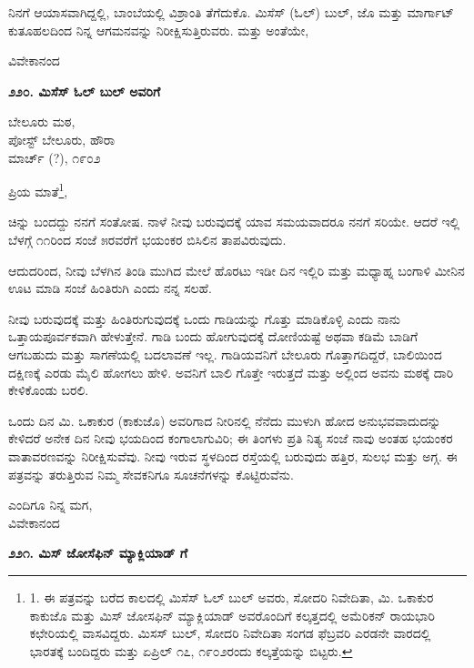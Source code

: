 ನಿನಗೆ ಆಯಾಸವಾಗಿದ್ದಲ್ಲಿ, ಬಾಂಬೆಯಲ್ಲಿ ವಿಶ್ರಾಂತಿ ತೆಗೆದುಕೊ. ಮಿಸೆಸ್ (ಓಲ್) ಬುಲ್, ಜೊ ಮತ್ತು ಮಾರ್ಗಾಟ್ ಕುತೂಹಲದಿಂದ ನಿನ್ನ ಆಗಮನವನ್ನು ನಿರೀಕ್ಷಿಸುತ್ತಿರುವರು. ಮತ್ತು ಅಂತೆಯೇ,

\begin{flushright}
ವಿವೇಕಾನಂದ
\end{flushright}

\begin{center}
\textbf{೨೨೦. ಮಿಸೆಸ್ ಓಲ್ ಬುಲ್ ಅವರಿಗೆ}
\end{center}

\begin{flushright}
ಬೇಲೂರು ಮಠ,\\ಪೋಸ್ಟ್ ಬೇಲೂರು, ಹೌರಾ\\ಮಾರ್ಚ್ (?), ೧೯೦೨
\end{flushright}

ಪ್ರಿಯ ಮಾತೆ\footnote{1. ಈ ಪತ್ರವನ್ನು ಬರೆದ ಕಾಲದಲ್ಲಿ ಮಿಸೆಸ್ ಓಲ್ ಬುಲ್ ಅವರು, ಸೋದರಿ ನಿವೇದಿತಾ, ಮಿ. ಒಕಾಕುರ ಕಾಕುಜೊ ಮತ್ತು ಮಿಸ್ ಜೋಸಫಿನ್ ಮ್ಯಾಕ್ಲಿಯಾಡ್ ಅವರೊಂದಿಗೆ ಕಲ್ಕತ್ತದಲ್ಲಿ ಅಮೆರಿಕನ್ ರಾಯಭಾರಿ ಕಛೇರಿಯಲ್ಲಿ ವಾಸವಿದ್ದರು. ಮಿಸಸ್ ಬುಲ್, ಸೋದರಿ ನಿವೇದಿತಾ ಸಂಗಡ ಫೆಬ್ರವರಿ ಎರಡನೇ ವಾರದಲ್ಲಿ ಭಾರತಕ್ಕೆ ಬಂದಿದ್ದರು ಮತ್ತು ಏಪ್ರಿಲ್ ೧೭, ೧೯೦೨ರಂದು ಕಲ್ಕತ್ತೆಯನ್ನು ಬಿಟ್ಟರು.},

ಚಿನ್ನು ಬಂದದ್ದು ನನಗೆ ಸಂತೋಷ. ನಾಳೆ ನೀವು ಬರುವುದಕ್ಕೆ ಯಾವ ಸಮಯವಾದರೂ ನನಗೆ ಸರಿಯೇ. ಆದರೆ ಇಲ್ಲಿ ಬೆಳಗ್ಗೆ ೧೧ರಿಂದ ಸಂಜೆ ೫ರವರೆಗೆ ಭಯಂಕರ ಬಿಸಿಲಿನ ತಾಪವಿರುವುದು.

ಆದುದರಿಂದ, ನೀವು ಬೆಳಗಿನ ತಿಂಡಿ ಮುಗಿದ ಮೇಲೆ ಹೊರಟು ಇಡೀ ದಿನ ಇಲ್ಲಿರಿ ಮತ್ತು ಮಧ್ಯಾಹ್ನ ಬಂಗಾಳಿ ಮೀನಿನ ಊಟ ಮಾಡಿ ಸಂಜೆ ಹಿಂತಿರುಗಿ ಎಂದು ನನ್ನ ಸಲಹೆ.

ನೀವು ಬರುವುದಕ್ಕೆ ಮತ್ತು ಹಿಂತಿರುಗುವುದಕ್ಕೆ ಒಂದು ಗಾಡಿಯನ್ನು ಗೊತ್ತು ಮಾಡಿಕೊಳ್ಳಿ ಎಂದು ನಾನು ಒತ್ತಾಯಪೂರ್ವಕವಾಗಿ ಹೇಳುತ್ತೇನೆ. ಗಾಡಿ ಬಂದು ಹೋಗುವುದಕ್ಕೆ ದೋಣಿಯಷ್ಟೆ ಅಥವಾ ಕಡಿಮೆ ಬಾಡಿಗೆ ಆಗಬಹುದು ಮತ್ತು ಸಾಗಣೆಯಲ್ಲಿ ಬದಲಾವಣೆ ಇಲ್ಲ. ಗಾಡಿಯವನಿಗೆ ಬೇಲೂರು ಗೊತ್ತಾಗದಿದ್ದರೆ, ಬಾಲಿಯಿಂದ ದಕ್ಷಿಣಕ್ಕೆ ಎರಡು ಮೈಲಿ ಹೋಗಲು ಹೇಳಿ. ಅವನಿಗೆ ಬಾಲಿ ಗೊತ್ತೇ ಇರುತ್ತದೆ ಮತ್ತು ಅಲ್ಲಿಂದ ಅವನು ಮಠಕ್ಕೆ ದಾರಿ ಕೇಳಿಕೊಂಡು ಬರಲಿ.

ಒಂದು ದಿನ ಮಿ. ಒಕಾಕುರ (ಕಾಕುಜೊ) ಅವರಿಗಾದ ನೀರಿನಲ್ಲಿ ನೆನೆದು ಮುಳುಗಿ ಹೋದ ಅನುಭವವಾದುದನ್ನು ಕೇಳಿದರೆ ಅನೇಕ ದಿನ ನೀವು ಭಯದಿಂದ ಕಂಗಾಲಾಗುವಿರಿ; ಈ ತಿಂಗಳು ಪ್ರತಿ ನಿತ್ಯ ಸಂಜೆ ನಾವು ಅಂತಹ ಭಯಂಕರ ವಾತಾವರಣವನ್ನು ನಿರೀಕ್ಷಿಸುವೆವು. ನೀವು ಇರುವ ಸ್ಥಳದಿಂದ ರಸ್ತೆಯಲ್ಲಿ ಬರುವುದು ಹತ್ತಿರ, ಸುಲಭ ಮತ್ತು ಅಗ್ಗ. ಈ ಪತ್ರವನ್ನು ತರುತ್ತಿರುವ ನಿಮ್ಮ ಸೇವಕನಿಗೂ ಸೂಚನೆಗಳನ್ನು ಕೊಟ್ಟಿರುವೆನು.

\begin{flushright}
ಎಂದಿಗೂ ನಿನ್ನ ಮಗ,\\ವಿವೇಕಾನಂದ
\end{flushright}

\begin{center}
\textbf{೨೨೧. ಮಿಸ್ ಜೋಸೆಫಿನ್ ಮ್ಯಾಕ್ಲಿಯಾಡ್ ಗೆ}
\end{center}

